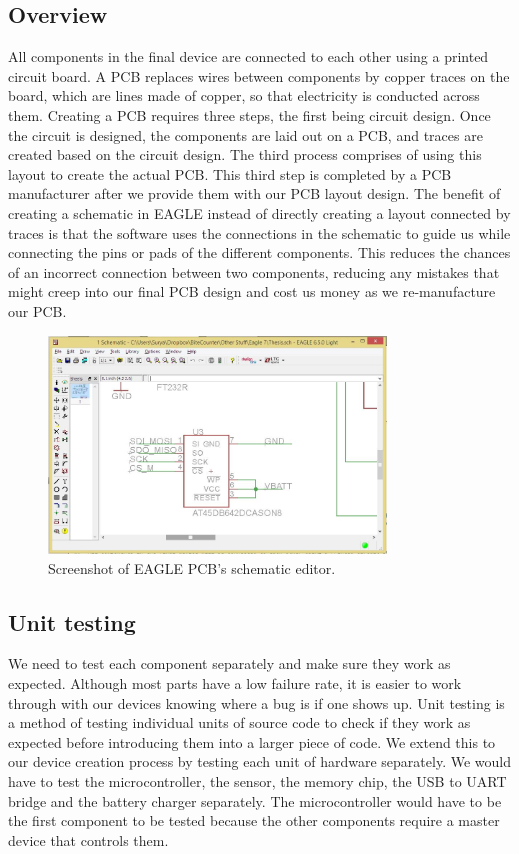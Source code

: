 \subsection{Overview}
\label{Sec:PCBDesign}
All components in the final device are connected to each other using a printed circuit board.
A PCB replaces wires between components by copper traces on the board,
which are lines made of copper, so that electricity is conducted across them.
Creating a PCB requires three steps, the first being circuit design.
Once the circuit is designed, the components are laid out on a PCB, and traces are created based on the circuit design.
The third process comprises of using this layout to create the actual PCB.
This third step is completed by a PCB manufacturer after we provide them with our PCB layout design.
The benefit of creating a schematic in EAGLE instead of directly creating a layout connected by traces
is that the software uses the connections in the schematic to guide us while connecting the pins or pads of the different components.
This reduces the chances of an incorrect connection between two components,
reducing any mistakes that might creep into our final PCB design and cost us money as we re-manufacture our PCB.
\begin{figure}
\begin{center}
\includegraphics[width=0.8\textwidth]{images/EagleScreen.jpg}
\caption{Screenshot of EAGLE PCB's schematic editor.}
\label{Fig:EaglePCBScreen}
\end{center}
\end{figure}

\subsection{Unit testing}
\label{Sec:UnitTesting}
We need to test each component separately and make sure they work as expected.
Although most parts have a low failure rate,
it is easier to work through with our devices knowing where a bug is 
if one shows up.
Unit testing is a method of testing individual units of source code to check if they work as expected before introducing them into a larger piece of code.
We extend this to our device creation process by testing each unit of hardware separately.
We would have to test the microcontroller, the sensor, the memory chip, the USB to UART bridge and the battery charger separately.
The microcontroller would have to be the first component to be tested because the other components require a master device that controls them.

